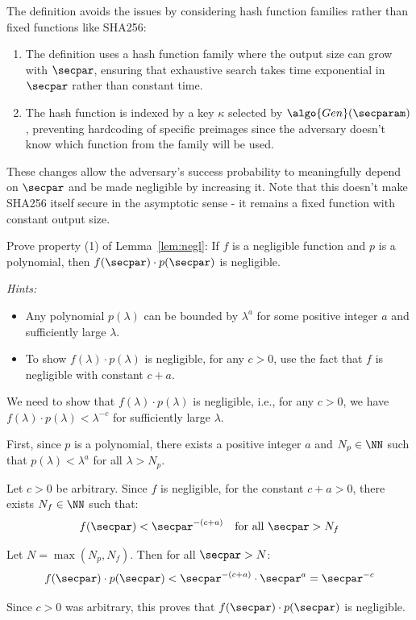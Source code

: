 \ifsolutions
\begin{mysolution}
  The definition avoids the issues by considering hash function families rather than fixed functions like SHA256:
  \begin{enumerate}
    \item The definition uses a hash function family where the output size can grow with $\secpar$, ensuring that exhaustive search takes time exponential in $\secpar$ rather than constant time.
    \item The hash function is indexed by a key $\kappa$ selected by $\algo{Gen}(\secparam)$, preventing hardcoding of specific preimages since the adversary doesn't know which function from the family will be used.
  \end{enumerate}
  These changes allow the adversary's success probability to meaningfully depend on $\secpar$ and be made negligible by increasing it.
  Note that this doesn't make SHA256 itself secure in the asymptotic sense - it remains a fixed function with constant output size.
\end{mysolution}
\fi

\begin{exercise}[Optional]\label{ex:negl-property-proof}
  Prove property (1) of Lemma~\ref{lem:negl}: If $f$ is a negligible function and $p$ is a polynomial, then $f(\secpar) \cdot p(\secpar)$ is negligible.
  
  \emph{Hints:}
  \begin{itemize}
    \item Any polynomial $p(\lambda)$ can be bounded by $\lambda^{a}$ for some positive integer $a$ and sufficiently large $\lambda$.
    \item To show $f(\lambda) \cdot p(\lambda)$ is negligible, for any $c > 0$, use the fact that $f$ is negligible with constant $c + a$.
  \end{itemize}
\end{exercise}

\ifsolutions
\begin{mysolution}
  We need to show that $f(\lambda) \cdot p(\lambda)$ is negligible, i.e., for any $c > 0$, we have $f(\lambda) \cdot p(\lambda) < \lambda^{-c}$ for sufficiently large $\lambda$.
  
  First, since $p$ is a polynomial, there exists a positive integer $a$ and $N_p \in \NN$ such that $p(\lambda) < \lambda^{a}$ for all $\lambda > N_p$.
  
  Let $c > 0$ be arbitrary. Since $f$ is negligible, for the constant $c + a > 0$, there exists $N_f \in \NN$ such that:
  \[
  f(\secpar) < \secpar^{-(c+a)} \quad \text{for all } \secpar > N_f
  \]
  
  Let $N = \max(N_p, N_f)$. Then for all $\secpar > N$:
  \[
  f(\secpar) \cdot p(\secpar) < \secpar^{-(c+a)} \cdot \secpar^{a} = \secpar^{-c}
  \]
  
  Since $c > 0$ was arbitrary, this proves that $f(\secpar) \cdot p(\secpar)$ is negligible.
\end{mysolution}
\fi

